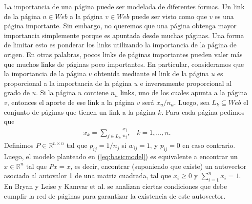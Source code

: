 \documentclass[11pt, a4paper]{article}
\begin{document}
La importancia de una p\'agina puede ser modelada de diferentes formas. Un link de la p\'agina $u \in
Web$ a la p\'agina $v \in Web$ puede ser visto como que $v$ es una p\'agina importante. Sin embargo, no queremos que una
p\'agina obtenga mayor importancia simplemente porque es apuntada desde muchas p\'aginas. 
Una forma de limitar esto es ponderar los links utilizando la importancia de la p\'agina de origen. En otras palabras,
pocos links de p\'aginas importantes pueden valer m\'as que muchos links de p\'aginas poco importantes. En particular,
consideramos que la importancia de la p\'agina $v$ obtenida mediante el link de la p\'agina $u$ es proporcional a la 
importancia de la p\'agina $u$ e inversamente proporcional al grado de $u$. Si la p\'agina $u$ contiene $n_u$ links,
uno de los cuales apunta a la p\'agina $v$, entonces el aporte de ese link a la p\'agina $v$ ser\'a $x_u/n_u$. Luego,
sea $L_k \subseteq Web$ el conjunto de p\'aginas que tienen un link a la p\'agina $k$. Para cada p\'agina pedimos que
\begin{eqnarray}
x_k = \sum_{j \in L_k} \frac{x_j}{n_j},~~~~k = 1,\dots,n. \label{eq:basicmodel}
\end{eqnarray}
Definimos $P \in  \mathbb{R}^{n \times n}$ tal que $p_{ij} = 1/n_j$ si $w_{ij} = 1$, y $p_{ij} = 0$ en caso contrario. Luego,
el modelo planteado en (\ref{eq:basicmodel}) es equivalente a encontrar un $x\in \mathbb{R}^n$ tal que $Px = x$, es
decir, encontrar (suponiendo que existe) un autovector asociado al autovalor 1 de una matriz cuadrada, tal que $x_i \ge
0$ y $\sum_{i = 1}^n x_i = 1$. En
Bryan y Leise \cite{Bryan2006} y Kamvar et al. \cite[Secci\'on 1]{Kamvar2003} se analizan ciertas condiciones que debe
cumplir la red de p\'aginas para garantizar la existencia de este autovector.
\end{document}
